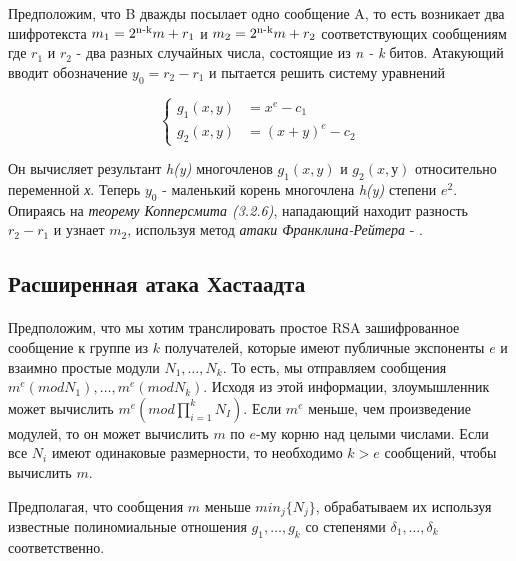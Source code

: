   Предположим, что B дважды посылает одно сообщение A, то есть возникает два шифротекста \textit{{$ m_1 = 2\textsuperscript{n-k}m + r_1 $}} и
  \textit{{$ m_2 = 2\textsuperscript{n-k}m + r_2 $}} соответствующих сообщениям где \textit{{$r_1$}} и \textit{{$r_2$}} - два разных случайных числа, состоящие из 
  \textit{n - k} битов. Атакующий вводит обозначение \textit{{$ y_0 = r_2 - r_1 $}} и пытается решить
  систему уравнений
  
    \begin{equation}
	  \begin{cases}
	    g_1(x,y) &= x^e - c_1 \\
	    g_2(x,y) &= (x+y)^e - c_2
	  \end{cases}    
      \end{equation}
      
  Он вычисляет результант \textit{h(y)} многочленов \textit{{$g_1(x,y)$}} и \textit{{$g_2(x,у)$}} относительно переменной \textit{х}. Теперь \textit{{$y_0$}} -
  маленький корень многочлена \textit{h(y)} степени \textit{{$e^2$}}. Опираясь на \textit{теорему Копперсмита (3.2.6)}, нападающий находит разность \textit{{$r_2 - r_1$}} и 
  узнает \textit{{$m_2$}}, используя метод \textit{атаки Франклина-Рейтера} - \cite[страницы 331-332]{may10}.

\subsection{Расширенная атака Хастаадта}

\paragraph{} Предположим, что мы хотим транслировать простое RSA зашифрованное сообщение к группе из {$k$} получателей, которые имеют публичные
  экспоненты {$e$} и взаимно простые модули {$N_1, \dots, N_k$}. То есть, мы отправляем сообщения {$m^e (mod N_1), \dots, m^e (mod N_k)$}. 
  Исходя из этой информации, злоумышленник может вычислить {$m^e (mod \prod_{i=1}^{k}{N_I})$}. Если {$m^e$} меньше, чем произведение модулей, то он 
  может вычислить {$m$} по {$e$}-му корню над целыми числами. Если все {$N_i$} имеют одинаковые размерности, то необходимо {$k > e$} сообщений,
  чтобы вычислить {$m$}.
  
  Предполагая, что сообщения {$m$} меньше {$min_j \{ N_j \}$}, обрабатываем их используя известные полиномиальные отношения {$g_1, \dots, g_k$}
  со степенями {$\delta_1, \dots, \delta_k$} соответственно.
  
